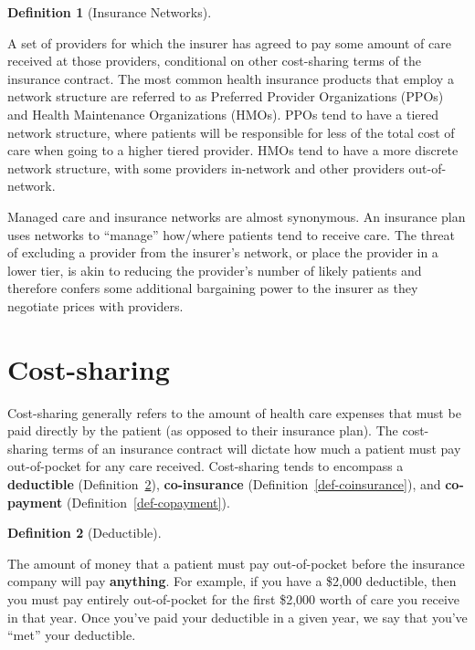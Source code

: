 \documentclass[
  letterpaper,
  DIV=11,
  numbers=noendperiod]{scrreport}
\theoremstyle{definition}
\newtheorem{definition}{Definition}[chapter]
\theoremstyle{remark}
\begin{document}
\begin{definition}[Insurance
Networks]\protect\hypertarget{def-insurancenetwork}{}\label{def-insurancenetwork}

A set of providers for which the insurer has agreed to pay some amount
of care received at those providers, conditional on other cost-sharing
terms of the insurance contract. The most common health insurance
products that employ a network structure are referred to as Preferred
Provider Organizations (PPOs) and Health Maintenance Organizations
(HMOs). PPOs tend to have a tiered network structure, where patients
will be responsible for less of the total cost of care when going to a
higher tiered provider. HMOs tend to have a more discrete network
structure, with some providers in-network and other providers
out-of-network.

\end{definition}

Managed care and insurance networks are almost synonymous. An insurance
plan uses networks to ``manage'' how/where patients tend to receive
care. The threat of excluding a provider from the insurer's network, or
place the provider in a lower tier, is akin to reducing the provider's
number of likely patients and therefore confers some additional
bargaining power to the insurer as they negotiate prices with providers.

\hypertarget{cost-sharing}{%
\section{Cost-sharing}\label{cost-sharing}}

Cost-sharing generally refers to the amount of health care expenses that
must be paid directly by the patient (as opposed to their insurance
plan). The cost-sharing terms of an insurance contract will dictate how
much a patient must pay out-of-pocket for any care received.
Cost-sharing tends to encompass a \textbf{deductible}
(Definition~\ref{def-deductible}), \textbf{co-insurance}
(Definition~\ref{def-coinsurance}), and \textbf{co-payment}
(Definition~\ref{def-copayment}).

\begin{definition}[Deductible]\protect\hypertarget{def-deductible}{}\label{def-deductible}

The amount of money that a patient must pay out-of-pocket before the
insurance company will pay \textbf{anything}. For example, if you have a
\$2,000 deductible, then you must pay entirely out-of-pocket for the
first \$2,000 worth of care you receive in that year. Once you've paid
your deductible in a given year, we say that you've ``met'' your
deductible.

\end{definition}
\end{document}
